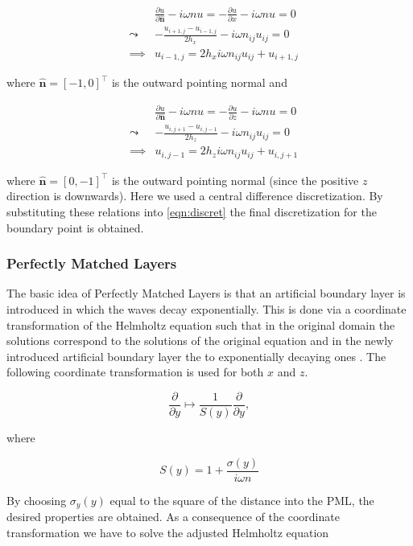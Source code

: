 \documentclass[10pt,a4paper]{article}
\newcommand{\n}{\mathbf{n}}
\begin{document}
\begin{eqnarray}
&& \frac{\partial u}{\partial \hat{\n}} - i\omega nu = -\frac{\partial u}{\partial x} - i\omega nu =0\\
&\leadsto& -\frac{u_{i+1,j}-u_{i-1,j}}{2h_x}-i\omega n_{ij} u_{ij}=0\\
&\implies& u_{i-1,j} = 2h_xi\omega n_{ij}u_{ij}+u_{i+1,j}
\end{eqnarray}

where $\hat{\n}=[-1,0]^\top$ is the outward pointing normal and 

\begin{eqnarray}
&& \frac{\partial u}{\partial \hat{\n}} - i\omega nu = -\frac{\partial u}{\partial z} - i\omega nu =0\\
&\leadsto& -\frac{u_{i,j+1}-u_{i,j-1}}{2h_z}-i\omega n_{ij} u_{ij}=0\\
&\implies& u_{i,j-1} = 2h_zi\omega n_{ij}u_{ij}+u_{i,j+1}
\end{eqnarray}

where $\hat{\n}=[0,-1]^\top$ is the outward pointing normal (since the positive $z$ direction is downwards). Here we used a central difference discretization. By substituting these relations into \cref{eqn:discret} the final discretization for the boundary point is obtained. 

\subsubsection{Perfectly Matched Layers}
The basic idea of Perfectly Matched Layers is that an artificial boundary layer is introduced in which the waves decay exponentially. This is done via a coordinate transformation of the Helmholtz equation such that in the original domain the solutions correspond to the solutions of the original equation and in the newly introduced artificial boundary layer the to exponentially decaying ones \cite{Erlangga2008}. The following coordinate transformation is used for both $x$ and $z$.

\begin{equation}
\frac{\partial }{\partial y} \mapsto \frac{1}{S(y)}\frac{\partial}{\partial y},
\end{equation}

where 

\begin{equation}
S(y)=1+\frac{\sigma(y)}{i\omega n}
\end{equation}

By choosing $\sigma_y(y)$ equal to the square of the distance into the PML, the desired properties are obtained. As a consequence of the coordinate transformation we have to solve the adjusted Helmholtz equation
\end{document}
